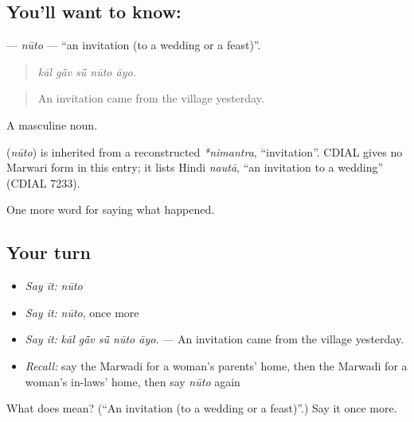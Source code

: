 \subsection*{You'll want to know: }
\textbf{} — \emph{nūto} — \textquotedblleft{}an invitation (to a wedding or a feast)\textquotedblright{}.

\begin{quote}
    
\end{quote}

\begin{quote}
\emph{kāl gā̃v sū̃ nūto āyo.}
\end{quote}

\begin{quote}
An invitation came from the village yesterday.
\end{quote}

A masculine noun.

\begin{cousinweb}
\textbf{} (\emph{nūto}) is inherited from a reconstructed \emph{*nimantra}, \textquotedblleft{}invitation\textquotedblright{}. CDIAL gives no Marwari form in this entry; it lists Hindi \emph{nautā}, \textquotedblleft{}an invitation to a wedding\textquotedblright{} (CDIAL 7233).
\end{cousinweb}

\begin{grammarlens}[title={What you've built}]
One more word for saying what happened.
\end{grammarlens}

\subsection*{Your turn}
\begin{itemize}
\raggedright
  \item \emph{Say it:} \emph{nūto}
  \item \emph{Say it:} \emph{nūto}, once more
  \item \emph{Say it:} \emph{kāl gā̃v sū̃ nūto āyo.} — An invitation came from the village yesterday.
  \item \emph{Recall:} say the Marwadi for a woman's parents' home, then the Marwadi for a woman's in-laws' home, then say \emph{nūto} again
\end{itemize}

\begin{tcolorbox}[breakable,colback=teal!4,colframe=teal!35!black,title={Before you move on}]
What does  mean? (\textquotedblleft{}An invitation (to a wedding or a feast)\textquotedblright{}.) Say it once more.
\end{tcolorbox}
